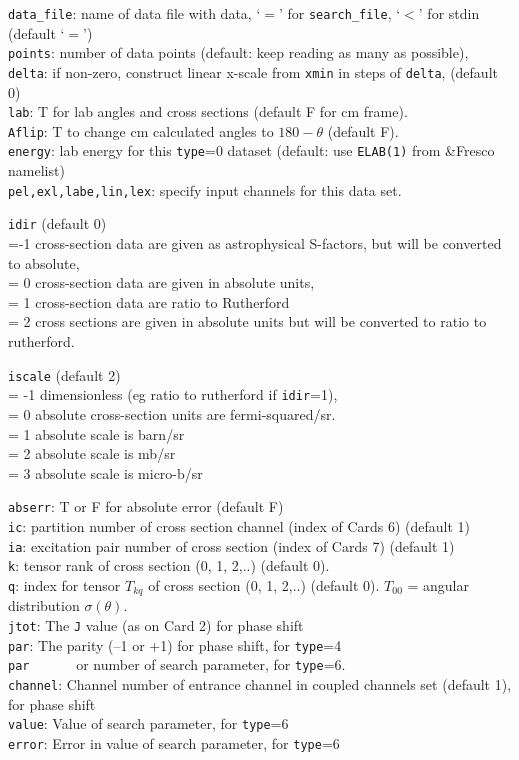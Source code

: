 \documentclass[11pt]{article}
\begin{document}
{\tt data\_file}: name of data file with data, `$=$' for {\tt search\_file},
 `$<$' for stdin (default `$=$')\\
{\tt points}: number of data points (default: keep reading as many as possible),
\\
{\tt delta}: if non-zero, construct linear x-scale from {\tt xmin} in steps of {\tt delta},
 (default 0)\\
{\tt lab}: T  for lab angles and cross sections (default F for cm frame).\\
{\tt Aflip}: T to change cm calculated angles to $180-\theta$ (default F).\\
{\tt energy}: lab energy for this {\tt type}=0 dataset (default: use {\tt ELAB(1)} from \&Fresco namelist)\\{\tt pel,exl,labe,lin,lex}: specify input channels for this data set.

{\tt idir} (default 0)
\\ =-1 cross-section data are given as astrophysical S-factors, but will be converted to absolute,
\\ = 0 cross-section data are given in absolute units,
\\ = 1 cross-section data are ratio to Rutherford
\\ = 2 cross sections are given in absolute units but will be
         converted to ratio to rutherford.



{\tt iscale} (default 2)
\\ = -1 dimensionless (eg ratio to rutherford if {\tt idir}=1),
\\ = 0 absolute cross-section units are fermi-squared/sr.
\\ = 1 absolute scale is barn/sr
\\ = 2 absolute scale is mb/sr
\\ = 3 absolute scale is micro-b/sr


{\tt abserr}: T or F for absolute error (default F)\\
{\tt ic}: partition number of cross section channel (index of Cards 6)  (default 1)\\
{\tt ia}: excitation pair number of cross section (index of Cards 7)  (default 1)\\
{\tt k}: tensor rank of cross section (0, 1, 2,..) (default 0). \\
{\tt q}: index for tensor $T_{kq}$ of cross section (0, 1, 2,..) (default 0).
    $T_{00}$ = angular distribution $\sigma(\theta)$.\\
{\tt jtot}: The {\tt J} value (as on Card 2) for phase shift\\
{\tt par}: The parity (--1 or +1) for phase shift, for {\tt type}=4\\
{\tt par}~~~~~~ or number of search parameter, for {\tt type}=6.\\
{\tt channel}: Channel number of entrance channel in coupled channels set (default 1),
for phase shift\\
{\tt value}: Value of search parameter, for {\tt type}=6\\
{\tt error}: Error in value of search parameter, for {\tt type}=6\\
~\\
\end{document}
